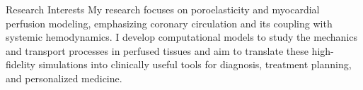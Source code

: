 \begin{rubric}{Research Interests}
\entry*[] My research focuses on poroelasticity and myocardial perfusion modeling, emphasizing coronary circulation and its coupling with systemic hemodynamics. I develop computational models to study the mechanics and transport processes in perfused tissues and aim to translate these high-fidelity simulations into clinically useful tools for diagnosis, treatment planning, and personalized medicine.
\end{rubric}